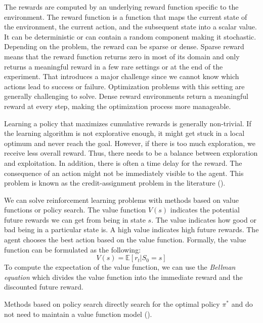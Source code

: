 The rewards are computed by an underlying reward function specific to the environment. The reward function is a function that maps the current state of the environment, the current action, and the subsequent state into a scalar value. It can be deterministic or can contain a random component making it stochastic. Depending on the problem, the reward can be sparse or dense. Sparse reward means that the reward function returns zero in most of its domain and only returns a meaningful reward in a few rare settings or at the end of the experiment. That introduces a major challenge since we cannot know which actions lead to success or failure. Optimization problems with this setting are generally challenging to solve. Dense reward environments return a meaningful reward at every step, making the optimization process more manageable.

Learning a policy that maximizes cumulative rewards is generally non-trivial. If the learning algorithm is not explorative enough, it might get stuck in a local optimum and never reach the goal. However, if there is too much exploration, we receive less overall reward. Thus, there needs to be a balance between exploration and exploitation. In addition, there is often a time delay for the reward. The consequence of an action might not be immediately visible to the agent. This problem is known as the credit-assignment problem in the literature (\cite{sutton2018reinforcement}).

We can solve reinforcement learning problems with methods based on value functions or policy search. The value function $V(s)$ indicates the potential future rewards we can get from being in state $s$. The value indicates how good or bad being in a particular state is. A high value indicates high future rewards. The agent chooses the best action based on the value function. Formally, the value function can be formulated as the following:
\begin{equation}\label{eq:value_function}
  V(s) = \mathbb{E} [r_t | S_0 = s]
\end{equation}
To compute the expectation of the value function, we can use the \textit{Bellman equation} which divides the value function into the immediate reward and the discounted future reward.

Methods based on policy search directly search for the optimal policy $\pi^*$ and do not need to maintain a value function model (\cite{8103164}).



